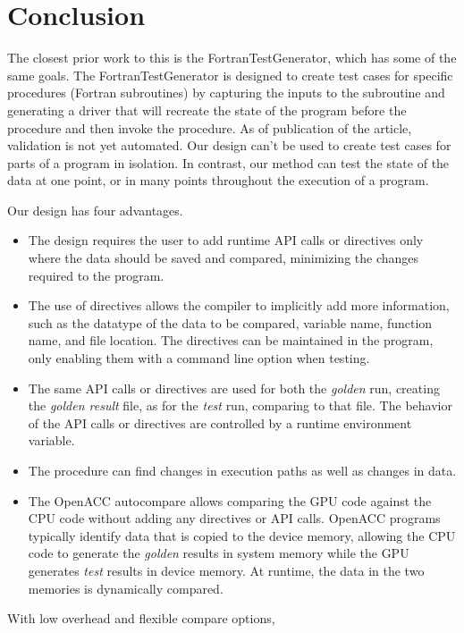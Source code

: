 \section{Conclusion}

The closest prior work to this is the FortranTestGenerator\cite{hovy.iwsehpc.16}, which has some of the same goals.
The FortranTestGenerator is designed to create test cases for specific procedures (Fortran subroutines) by capturing the inputs to the subroutine and generating a driver that will recreate the state of the program before the procedure and then invoke the procedure.
As of publication of the article, validation is not yet automated.
Our design can't be used to create test cases for parts of a program in isolation.
In contrast, our method can test the state of the data at one point, or in many points throughout the execution of a program.

Our design has four advantages.
\begin{itemize}
\item The design requires the user to add runtime API calls or directives only where the data should be saved and compared, minimizing the changes required to the program.
\item The use of directives allows the compiler to implicitly add more information, such as the datatype of the data to be compared, variable name, function name, and file location.
The directives can be maintained in the program, only enabling them with a command line option when testing.
\item The same API calls or directives are used for both the \emph{golden} run, creating the \emph{golden result} file, as for the \emph{test} run, comparing to that file.
The behavior of the API calls or directives are controlled by a runtime environment variable.
\item The procedure can find changes in execution paths as well as changes in data.
\item The OpenACC autocompare allows comparing the GPU code against the CPU code without adding any directives or API calls.
OpenACC programs typically identify data that is copied to the device memory, allowing the CPU code to generate the \emph{golden} results in system memory while the GPU generates \emph{test} results in device memory.
At runtime, the data in the two memories is dynamically compared.
\end{itemize}

With low overhead and flexible compare options, 
